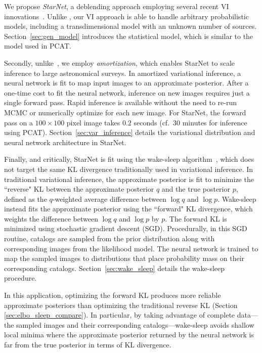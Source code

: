 \nopagebreak[4]

We propose {\itshape StarNet}, a deblending approach employing several recent VI innovations~\cite{zhang2019advances,le2020revisiting}.
Unlike \cite{regier2019_celeste}, our VI approach is able to handle arbitrary probabilistic models, including a transdimensional model with an unknown number of sources. Section~\ref{sec:gen_model} introduces the statistical model, which is similar to the model used in PCAT.

Secondly, unlike~\cite{regier2019_celeste}, 
we employ {\itshape amortization}, which enables StarNet to scale inference to large astronomical surveys. 
In amortized variational inference, a neural network is fit to map input images to an approximate posterior.
After a one-time cost to fit the neural network, inference 
on new images requires just a single forward pass.
Rapid inference is available without the need to re-run MCMC or numerically optimize for each new image. 
For StarNet, the forward pass on 
a $100 \times 100$ pixel image takes $0.2$ seconds (cf.~30 minutes for inference using PCAT).
Section~\ref{sec:var_inference} details the variational distribution and neural network architecture in StarNet. 

Finally, and critically, StarNet is fit using the wake-sleep algorithm~\cite{Hinton1995wake_sleep}, which does not target the same KL divergence traditionally used in  variational inference. In traditional variational inference, the approximate posterior is fit to minimize the ``reverse" KL between the approximate posterior $q$ and the true posterior $p$, defined as the $q$-weighted average difference between $\log q$ and $\log p$. 
Wake-sleep instead fits the approximate posterior using the ``forward" KL divergence, which weights the difference between $\log q$ and $\log p$ by $p$.
The forward KL is minimized using stochastic gradient descent (SGD). 
Procedurally, in this SGD routine, catalogs are sampled from the prior distribution along with corresponding images from the likelihood model. 
The neural network is trained to map the sampled images to distributions that place probability mass on their corresponding catalogs. Section~\ref{sec:wake_sleep} details the wake-sleep procedure. 

In this application, optimizing the forward KL produces more reliable approximate posteriors than optimizing the traditional reverse KL (Section \ref{sec:elbo_sleep_compare}). 
In particular, by taking advantage of complete data---the sampled images and their corresponding catalogs---wake-sleep avoids shallow local minima where the approximate posterior returned by the neural network is far from the true posterior in terms of KL divergence. 

